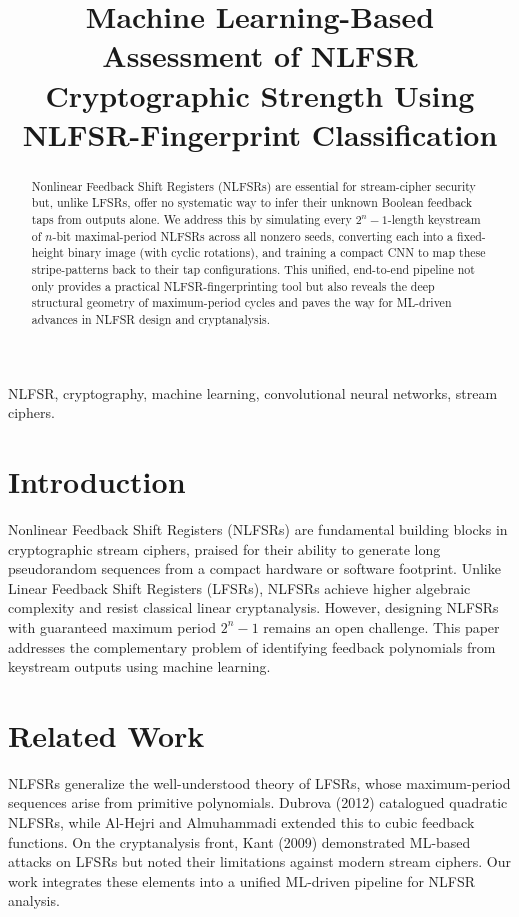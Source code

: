 \documentclass[conference]{IEEEtran}
\title{Machine Learning-Based Assessment of NLFSR Cryptographic Strength Using NLFSR-Fingerprint Classification}
\author{
  \IEEEauthorblockN{Sultan Almuhammadi, Abdulmumin Sa'ad, Mohammed Mansour}
  \IEEEauthorblockA{
    Department of Computer Engineering,\\
    King Fahd University of Petroleum and Minerals,\\
    Dhahran, Saudi Arabia\\
    Email: \{muhamadi, g202203620, g202423860\}@kfupm.edu.sa
  }
}
\begin{document}
\maketitle

\begin{abstract}
Nonlinear Feedback Shift Registers (NLFSRs) are essential for stream-cipher security but, unlike LFSRs, offer no systematic way to infer their unknown Boolean feedback taps from outputs alone. We address this by simulating every $2^{n}-1$-length keystream of $n$-bit maximal-period NLFSRs across all nonzero seeds, converting each into a fixed-height binary image (with cyclic rotations), and training a compact CNN to map these stripe-patterns back to their tap configurations. This unified, end-to-end pipeline not only provides a practical NLFSR-fingerprinting tool but also reveals the deep structural geometry of maximum-period cycles and paves the way for ML-driven advances in NLFSR design and cryptanalysis.
\end{abstract}

\begin{IEEEkeywords}
NLFSR, cryptography, machine learning, convolutional neural networks, stream ciphers.
\end{IEEEkeywords}

\section{Introduction}
Nonlinear Feedback Shift Registers (NLFSRs) are fundamental building blocks in cryptographic stream ciphers, praised for their ability to generate long pseudorandom sequences from a compact hardware or software footprint. Unlike Linear Feedback Shift Registers (LFSRs), NLFSRs achieve higher algebraic complexity and resist classical linear cryptanalysis. However, designing NLFSRs with guaranteed maximum period $2^{n}-1$ remains an open challenge. This paper addresses the complementary problem of identifying feedback polynomials from keystream outputs using machine learning.

\section{Related Work}
NLFSRs generalize the well-understood theory of LFSRs, whose maximum-period sequences arise from primitive polynomials. Dubrova (2012) catalogued quadratic NLFSRs, while Al-Hejri and Almuhammadi extended this to cubic feedback functions. On the cryptanalysis front, Kant (2009) demonstrated ML-based attacks on LFSRs but noted their limitations against modern stream ciphers. Our work integrates these elements into a unified ML-driven pipeline for NLFSR analysis.
\end{document}
